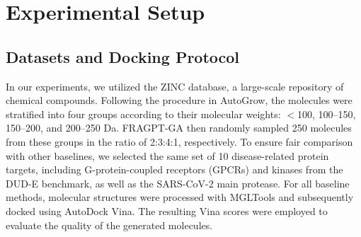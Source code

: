 \documentclass[lettersize,journal]{IEEEtran}
\begin{document}
\section{Experimental Setup}
\subsection{Datasets and Docking Protocol}

In our experiments, we utilized the ZINC database, a large-scale repository of chemical compounds. Following the procedure in AutoGrow, the molecules were stratified into four groups according to their molecular weights: $<$100, 100–150, 150–200, and 200–250 Da. FRAGPT-GA then randomly sampled 250 molecules from these groups in the ratio of 2:3:4:1, respectively. To ensure fair comparison with other baselines, we selected the same set of 10 disease-related protein targets, including G-protein-coupled receptors (GPCRs) and kinases from the DUD-E benchmark, as well as the SARS-CoV-2 main protease. For all baseline methods, molecular structures were processed with MGLTools and subsequently docked using AutoDock Vina. The resulting Vina scores were employed to evaluate the quality of the generated molecules.

\end{document}
